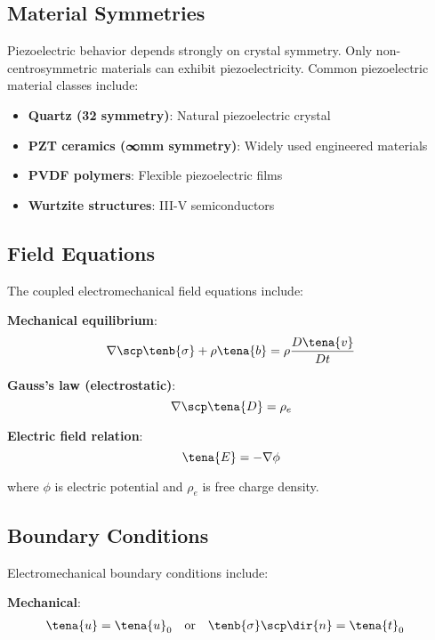 \subsection{Material Symmetries}

Piezoelectric behavior depends strongly on crystal symmetry. Only non-centrosymmetric materials can exhibit piezoelectricity. Common piezoelectric material classes include:

\begin{itemize}
\item \textbf{Quartz (32 symmetry)}: Natural piezoelectric crystal
\item \textbf{PZT ceramics (∞mm symmetry)}: Widely used engineered materials
\item \textbf{PVDF polymers}: Flexible piezoelectric films
\item \textbf{Wurtzite structures}: III-V semiconductors
\end{itemize}

\subsection{Field Equations}

The coupled electromechanical field equations include:

\textbf{Mechanical equilibrium}:
\begin{equation}
\nabla \scp \tenb{\sigma} + \rho \tena{b} = \rho \frac{D\tena{v}}{Dt}
\end{equation}

\textbf{Gauss's law (electrostatic)}:
\begin{equation}
\nabla \scp \tena{D} = \rho_e
\end{equation}

\textbf{Electric field relation}:
\begin{equation}
\tena{E} = -\nabla \phi
\end{equation}

where $\phi$ is electric potential and $\rho_e$ is free charge density.

\subsection{Boundary Conditions}

Electromechanical boundary conditions include:

\textbf{Mechanical}:
\begin{align}
\tena{u} &= \tena{u}_0 \quad \text{or} \quad \tenb{\sigma} \scp \dir{n} = \tena{t}_0
\end{align}

